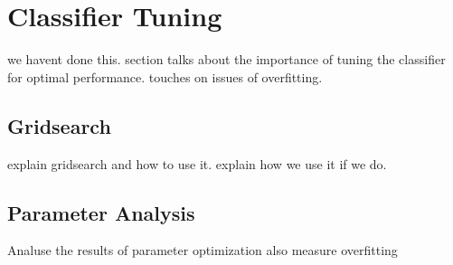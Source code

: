 \section{Classifier Tuning}
we havent done this.
section talks about the importance of tuning the classifier for
optimal performance.
touches on issues of overfitting.


\subsection{Gridsearch}
explain gridsearch and how to use it.
explain how we use it if we do.

\subsection{Parameter Analysis}
Analuse the results of parameter optimization
also measure overfitting
